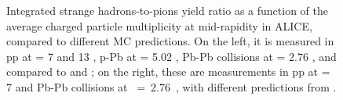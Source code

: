 \begin{figure}[t]
\hspace*{-1.25cm}
\caption{Integrated strange hadrons-to-pions yield ratio as a function of the average charged particle multiplicity at mid-rapidity in ALICE, compared to different MC predictions. On the left, it is measured in pp at \sqrtS = 7 and 13 \tev, p-Pb at \sqrtSnn = 5.02 \tev, Pb-Pb collisions at \sqrtSnn = 2.76 \tev , and compared to \Pythiaeight and \Herwig\cite{acharyaMultiplicityDependencePi2020}; on the right, these are measurements in pp at \sqrtS = 7 \tev and Pb-Pb collisions at \sqrtSnn~=~2.76~\tev, with different predictions from \Epos \cite{wernerCorecoronaProcedureMicrocanonical2023}.}
	\label{fig:MCModelStrangenessEnhancement}
\end{figure}

